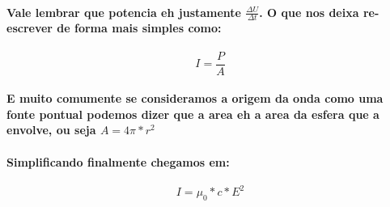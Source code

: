 \documentclass[12pt,twoside, a4paper, twocolumn]{article}
\begin{document}
\paragraph*{Vale lembrar que potencia eh justamente $\frac{\Delta{U}}{\Delta{t}}$. O que nos deixa re-escrever de forma mais simples como:}
\begin{equation}
    I = \frac{P}{A}
\end{equation}
\paragraph*{E muito comumente se consideramos a origem da onda como uma fonte pontual podemos dizer que a area eh a area da esfera que a envolve, ou seja $A = 4\pi * r^2$}
\paragraph*{Simplificando finalmente chegamos em:}
\begin{equation}
    I = \mu_0 * c * E^2
\end{equation}
\end{document}
